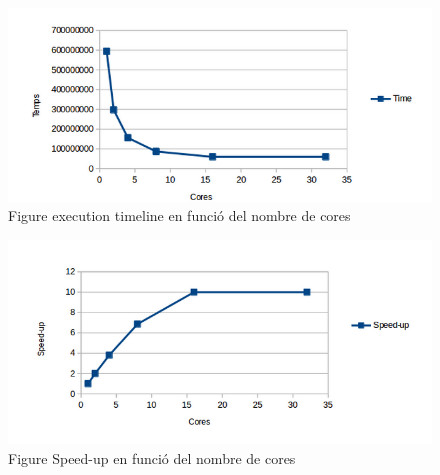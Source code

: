 \documentclass[a4paper,11pt]{article}
\begin{document}
\begin{enumerate}
        \clearpage

        \begin{figure}[!ht]
          \begin{center}
          \includegraphics[width=1\textwidth]{temps_cores.png}
          \caption{Figure execution timeline en funció del nombre de cores}
          \end{center}
        \end{figure}

        \begin{figure}[!ht]
          \begin{center}
            \includegraphics[width=1\textwidth]{speedup_cores.png}
          \caption{Figure Speed-up en funció del nombre de cores}
          \end{center}
        \end{figure}

  \end{enumerate}
\end{document}
